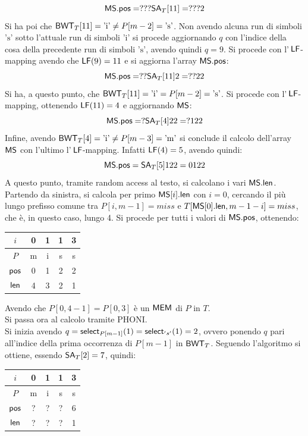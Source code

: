 \begin{esempio}
  \[\mbox{\rm {\sf MS}}.\mbox{\rm {\sf pos}} = ???\mbox{\rm {\sf SA}}_T[11]=???2\]
  Si ha poi che $\mbox{\rm {\sf BWT}}_T[11]=\mbox{'i'}\neq P[m-2]=\mbox{'s'}$. Non avendo alcuna
  run di simboli $\mbox{'s'}$ sotto l'attuale run di simboli $\mbox{'i'}$ si
  procede aggiornando $q$ con l'indice della cosa della precedente run di
  simboli $\mbox{'s'}$, avendo quindi $q=9$. Si procede con
  l'$\,\mbox{\rm {\sf LF}}$-mapping avendo che $\mbox{\rm {\sf LF}}(9)=11$ e si aggiorna l'array $\mbox{\rm {\sf MS}}.\mbox{\rm {\sf pos}}$:
  \[\mbox{\rm {\sf MS}}.\mbox{\rm {\sf pos}} = ??\mbox{\rm {\sf SA}}_T[11]2=??22\]
  Si ha, a questo punto, che $\mbox{\rm {\sf BWT}}_T[11]=\mbox{'i'}= P[m-2]=\mbox{'s'}$. Si
  procede con l'$\,\mbox{\rm {\sf LF}}$-mapping, ottenendo $\mbox{\rm {\sf LF}}(11)=4$ e aggiornando $\mbox{\rm {\sf MS}}$:
  \[\mbox{\rm {\sf MS}}.\mbox{\rm {\sf pos}} = ?\mbox{\rm {\sf SA}}_T[4]22=?122\]
  Infine, avendo $\mbox{\rm {\sf BWT}}_T[4]=\mbox{'i'}\neq P[m-3]=\mbox{'m'}$ si conclude il
  calcolo dell'array $\mbox{\rm {\sf MS}}$ con l'ultimo l'$\,\mbox{\rm {\sf LF}}$-mapping. Infatti $\mbox{\rm {\sf LF}}(4)=5$,
  avendo quindi:
  \[\mbox{\rm {\sf MS}}.\mbox{\rm {\sf pos}} = \mbox{\rm {\sf SA}}_T[5]122=0122\]
  A questo punto, tramite random access al testo, si calcolano i vari
  $\mbox{\rm {\sf MS}}.\mbox{\rm {\sf len}}$. Partendo da sinistra, si calcola per primo $\mbox{\rm {\sf MS}}[i].\mbox{\rm {\sf len}}$ con $i=0$,
  cercando il più lungo prefisso comune tra $P[i,m-1]=miss$ e $T[\mbox{\rm {\sf MS}}[0].\mbox{\rm {\sf len}},
  m-1-i]=miss$, che è, in questo caso, lungo 4. Si procede per tutti i valori di
  $\mbox{\rm {\sf MS}}.\mbox{\rm {\sf pos}}$, ottenendo:
  \begin{table}[H]
    \centering
    \begin{tabular}{c||c|c|c|c}
      $i$ & 0 & 1 & 1 & 3 \\
      \hline
      $P$ & m & i & s & s \\
      \hline
      \hline
      $\mbox{\rm {\sf pos}}$ & 0 & 1 & 2 & 2\\
      \hline
      $\mbox{\rm {\sf len}}$ & 4 & 3 & 2 & 1\\
    \end{tabular}
  \end{table}
  Avendo che $P[0,4-1]=P[0,3]$ è un $\mbox{\rm {\sf MEM}}$ di $P$ in $T$.\\
  Si passa ora al calcolo tramite PHONI.\\
  Si inizia avendo $q=\mbox{\rm {\sf select}}_{P[m-1]}(1)=\mbox{\rm {\sf select}}_{'s'}(1)=2$, ovvero ponendo $q$
  pari all'indice della prima occorrenza di $P[m-1]$ in $\mbox{\rm {\sf BWT}}_T$. Seguendo
  l'algoritmo si ottiene, essendo $\mbox{\rm {\sf SA}}_T[2]=7$, quindi:
  \begin{table}[H]
    \centering
    \begin{tabular}{c||c|c|c|c}
      $i$ & 0 & 1 & 1 & 3 \\
      \hline
      $P$ & m & i & s & s \\
      \hline
      \hline
      $\mbox{\rm {\sf pos}}$ & ? & ? & ? & 6\\
      \hline
      $\mbox{\rm {\sf len}}$ & ? & ? & ? & 1\\

\end{tabular}
\end{table}
\end{esempio}
